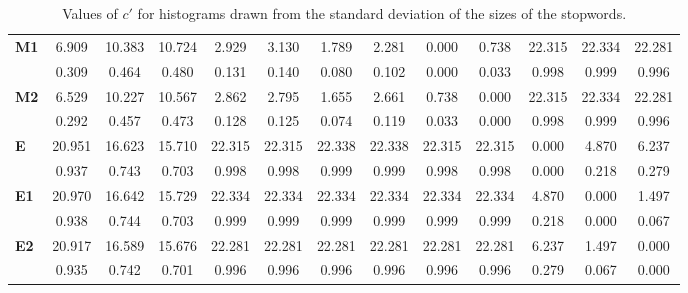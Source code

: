 \begin{table*}[h!]
\begin{center}
\begin{tabular}{| l || c | c | c || c | c | c || c | c | c || c | c | c |}
{\bf M1} & 6.909 & 10.383 & 10.724 & 2.929 & 3.130 & 1.789 & 2.281 & 0.000 & 0.738 & 22.315 & 22.334 & 22.281 \\
 & 0.309  & 0.464  & 0.480  & 0.131  & 0.140  & 0.080  & 0.102  & 0.000  & 0.033  & 0.998  & 0.999  & 0.996 \\\hline
{\bf M2} & 6.529 & 10.227 & 10.567 & 2.862 & 2.795 & 1.655 & 2.661 & 0.738 & 0.000 & 22.315 & 22.334 & 22.281 \\
 & 0.292  & 0.457  & 0.473  & 0.128  & 0.125  & 0.074  & 0.119  & 0.033  & 0.000  & 0.998  & 0.999  & 0.996 \\\hline\hline
{\bf E} & 20.951 & 16.623 & 15.710 & 22.315 & 22.315 & 22.338 & 22.338 & 22.315 & 22.315 & 0.000 & 4.870 & 6.237 \\
 & 0.937  & 0.743  & 0.703  & 0.998  & 0.998  & 0.999  & 0.999  & 0.998  & 0.998  & 0.000  & 0.218  & 0.279 \\\hline
{\bf E1} & 20.970 & 16.642 & 15.729 & 22.334 & 22.334 & 22.334 & 22.334 & 22.334 & 22.334 & 4.870 & 0.000 & 1.497 \\
 & 0.938  & 0.744  & 0.703  & 0.999  & 0.999  & 0.999  & 0.999  & 0.999  & 0.999  & 0.218  & 0.000  & 0.067 \\\hline
{\bf E2} & 20.917 & 16.589 & 15.676 & 22.281 & 22.281 & 22.281 & 22.281 & 22.281 & 22.281 & 6.237 & 1.497 & 0.000 \\
 & 0.935  & 0.742  & 0.701  & 0.996  & 0.996  & 0.996  & 0.996  & 0.996  & 0.996  & 0.279  & 0.067  & 0.000 \\\hline
\end{tabular}
\caption{Values of $c'$ for histograms drawn from the standard deviation of the sizes of the stopwords.}
\end{center}
\end{table*}